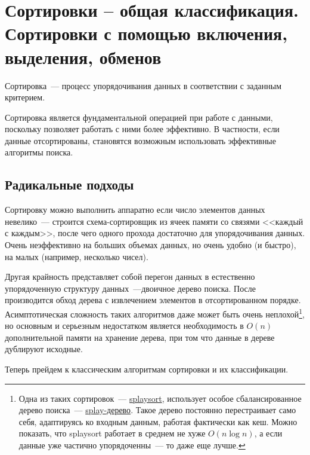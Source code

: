 %
%

\section{Сортировки – общая классификация. Сортировки с помощью включения, выделения, обменов}
Сортировка~--- процесс упорядочивания данных в соответствии с заданным критерием.

Сортировка является фундаментальной операцией при работе с данными, поскольку позволяет работать с ними более
эффективно. В частности, если данные отсортированы, становятся возможным использовать эффективные алгоритмы поиска.

\subsection{Радикальные подходы}
Сортировку можно выполнить аппаратно если число элементов данных невелико~--- строится схема-сортировщик из ячеек памяти
со связями <<каждый с каждым>>, после чего одного прохода достаточно для упорядочивания данных. Очень
неэффективно на больших объемах данных, но очень удобно (и быстро), на малых (например, несколько чисел).

Другая крайность представляет собой перегон данных в естественно упорядоченную структуру данных~---двоичное дерево поиска. После
производится обход дерева с извлечением элементов в отсортированном порядке.
Асимптотическая сложность таких алгоритмов даже может быть очень неплохой\footnote{
  Одна из таких сортировок~--- \href{https://en.wikipedia.org/wiki/Splaysort}{splaysort}, использует особое
  сбалансированное дерево поиска~--- \href{https://en.wikipedia.org/wiki/Splay_tree}{splay-дерево}. Такое дерево постоянно перестраивает
  само себя, адаптируясь ко входным данным, работая фактически как кеш. Можно показать, что splaysort работает в среднем не хуже
  \(O(n\log{n})\), а если данные уже частично упорядоченны~--- то даже еще лучше.
}, но основным и серьезным недостатком является
необходимость в \(O(n)\) дополнительной памяти на хранение дерева, при том что данные в дереве дублируют исходные.

Теперь прейдем к классическим алгоритмам сортировки и их классификации.
